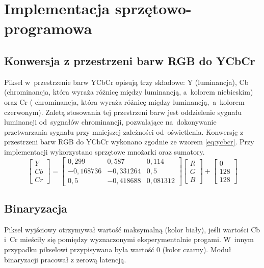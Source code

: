 \section{Implementacja sprzętowo-programowa}
\label{sec:implementacja_sprzetowo_programowa}

\subsection{Konwersja z przestrzeni barw RGB do YCbCr}
\label{subsec:konwersja}

Piksel w~przestrzenie barw YCbCr opisują trzy składowe: Y (luminancja), Cb (chrominancja, która wyraża różnicę między luminancją, a~kolorem niebieskim) oraz Cr ( chrominancja, która wyraża różnicę między luminancją,~a~kolorem czerwonym). 
Zaletą stosowania tej przestrzeni barw jest oddzielenie sygnału luminancji od~sygnałów chrominancji, pozwalające na~dokonywanie przetwarzania sygnału przy mniejszej zależności od~oświetlenia.
Konwersję z przestrzeni barw RGB do YCbCr wykonano zgodnie ze wzorem \ref{eq:ycbcr}. 
Przy implementacji wykorzystano sprzętowe mnożarki oraz sumatory.
\begin{equation}
\label{eq:ycbcr}
\begin{bmatrix} Y \\ 
				Cb\\
				Cr
\end{bmatrix}=
\begin{bmatrix} 0,299 & 0,587 & 0,114\\ 
				-0,168736 & -0,331264 & 0,5\\
				0,5 & -0,418688 & 0,081312
\end{bmatrix}
\begin{bmatrix} R\\
				G\\
				B
\end{bmatrix}+
\begin{bmatrix} 0\\
				128\\
				128
\end{bmatrix}
\end{equation}



\subsection{Binaryzacja}
\label{subsec:Binaryzacja}
Piksel wyjściowy otrzymywał wartość maksymalną (kolor biały), jeśli wartości Cb i~Cr mieściły się pomiędzy wyznaczonymi eksperymentalnie progami. 
W~innym przypadku pikselowi przypisywana była wartość 0 (kolor czarny). 
Moduł binaryzacji pracował z zerową latencją.

